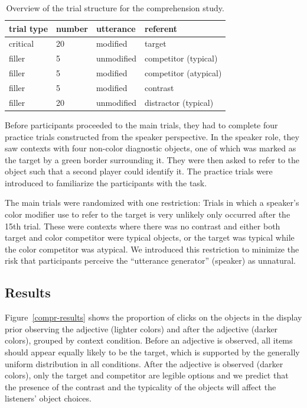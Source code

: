 \documentclass[10pt,letterpaper]{article}
\begin{document}
\begin{table}
	\begin{center} 
	\caption{Overview of the trial structure for the comprehension study.} 
	\label{tab:trialstructure}
	\vskip 0.12in
	\begin{tabular}{llll} 
	\hline
	\textbf{trial type} & \textbf{number} & \textbf{utterance} & \textbf{referent} \\
	\hline
	critical  & 20     & modified       & target                \\
	filler    & 5      & unmodified     & competitor (typical)  \\
	filler    & 5      & modified       & competitor (atypical) \\
	filler    & 5      & modified       & contrast              \\
	filler    & 20     & unmodified     & distractor (typical)  \\
	\hline
	\end{tabular} 
	\end{center} 
	\end{table}

Before participants proceeded to the main trials, they had to complete four practice trials constructed from the speaker perspective. In the speaker role, they saw contexts with four non-color diagnostic objects, one of which was marked as the target by a green border surrounding it. They were then asked to refer to the object such that a second player could identify it. The practice trials were introduced to familiarize the participants with the task.

The main trials were randomized with one restriction: Trials in which a speaker's color modifier use to refer to the target is very unlikely only occurred after the 15th trial. These were contexts where there was no contrast and either both target and color competitor were typical objects, or the target was typical while the color competitor was atypical. We introduced this restriction to minimize the risk that participants perceive the ``utterance generator'' (speaker) as unnatural.


\subsection{Results}
Figure~\ref{compr-results} shows the proportion of clicks on the objects in the display prior observing the adjective (lighter colors) and after the adjective (darker colors), grouped by context condition. Before an adjective is observed, all items should appear equally likely to be the target, which is supported by the generally uniform distribution in all conditions. After the adjective is observed (darker colors), only the target and competitor are legible options and we predict that the presence of the contrast and the typicality of the objects will affect the listeners' object choices.
\end{document}
